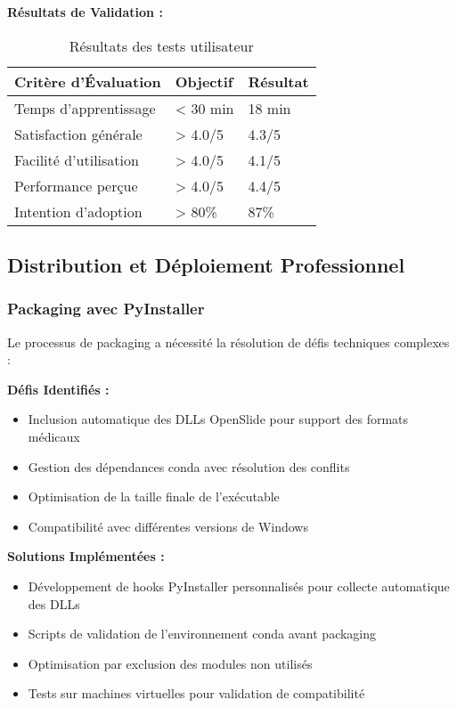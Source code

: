 \documentclass[12pt,a4paper]{article}
\begin{document}
\textbf{Résultats de Validation :}

\begin{table}[h]
\centering
\begin{tabular}{|p{5cm}|p{3cm}|p{3cm}|}
\hline
\textbf{Critère d'Évaluation} & \textbf{Objectif} & \textbf{Résultat} \\
\hline
Temps d'apprentissage & < 30 min & 18 min \\
\hline
Satisfaction générale & > 4.0/5 & 4.3/5 \\
\hline
Facilité d'utilisation & > 4.0/5 & 4.1/5 \\
\hline
Performance perçue & > 4.0/5 & 4.4/5 \\
\hline
Intention d'adoption & > 80\% & 87\% \\
\hline
\end{tabular}
\caption{Résultats des tests utilisateur}
\end{table}

\subsection{Distribution et Déploiement Professionnel}

\subsubsection{Packaging avec PyInstaller}

Le processus de packaging a nécessité la résolution de défis techniques complexes :

\textbf{Défis Identifiés :}
\begin{itemize}
\item Inclusion automatique des DLLs OpenSlide pour support des formats médicaux
\item Gestion des dépendances conda avec résolution des conflits
\item Optimisation de la taille finale de l'exécutable
\item Compatibilité avec différentes versions de Windows
\end{itemize}

\textbf{Solutions Implémentées :}
\begin{itemize}
\item Développement de hooks PyInstaller personnalisés pour collecte automatique des DLLs
\item Scripts de validation de l'environnement conda avant packaging
\item Optimisation par exclusion des modules non utilisés
\item Tests sur machines virtuelles pour validation de compatibilité
\end{itemize}
\end{document}
